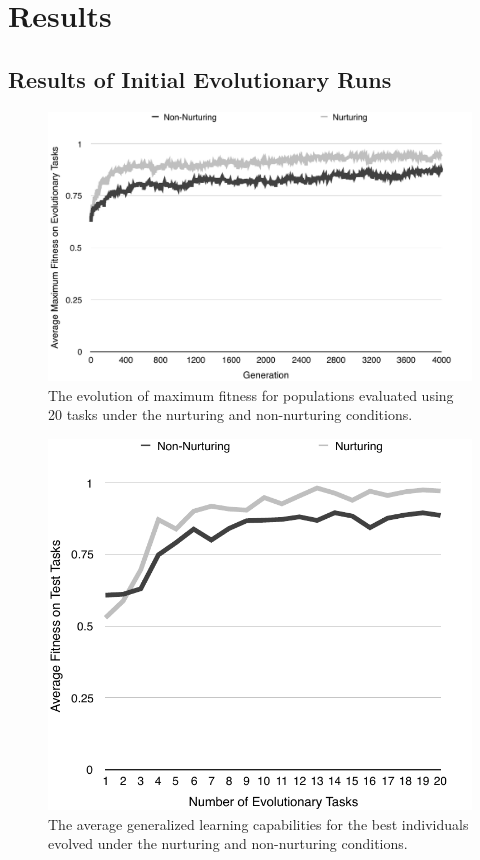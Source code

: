 \documentclass[master]{outhesis}
\begin{document}
\chapter{Results}

\section{Results of Initial Evolutionary Runs}

\begin{figure}[H]
	\centering
	\includegraphics{ChalmersEvolution.pdf}
	\caption{The evolution of maximum fitness for populations evaluated using 20 tasks under the nurturing and non-nurturing conditions.}
\end{figure}


\begin{figure}[H]
	\centering
	\includegraphics{ChalmersLearningTest.pdf}
	\caption{The average generalized learning capabilities for the best individuals evolved under the nurturing and non-nurturing conditions.}
\end{figure}
\end{document}
